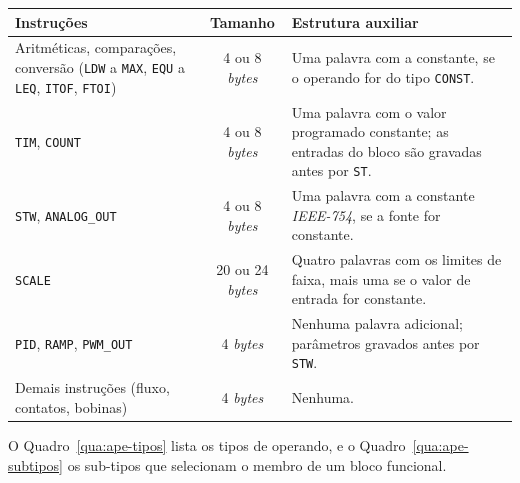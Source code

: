 \begin{quadrofixo}
    \centering
    \begin{tabular}{|p{4.6cm}|c|p{6.4cm}|}
        \hline
        Instruções & Tamanho & Estrutura auxiliar \\
        \hline
        Aritméticas, comparações, conversão (\texttt{LDW} a \texttt{MAX}, \texttt{EQU} a \texttt{LEQ}, \texttt{ITOF}, \texttt{FTOI}) & 4 ou 8 \textit{bytes} & Uma palavra com a constante, se o operando for do tipo \texttt{CONST}. \\
        \hline
        \texttt{TIM}, \texttt{COUNT} & 4 ou 8 \textit{bytes} & Uma palavra com o valor programado constante; as entradas do bloco são gravadas antes por \texttt{ST}. \\
        \hline
        \texttt{STW}, \texttt{ANALOG\_OUT} & 4 ou 8 \textit{bytes} & Uma palavra com a constante \textit{IEEE-754}, se a fonte for constante. \\
        \hline
        \texttt{SCALE} & 20 ou 24 \textit{bytes} & Quatro palavras com os limites de faixa, mais uma se o valor de entrada for constante. \\
        \hline
        \texttt{PID}, \texttt{RAMP}, \texttt{PWM\_OUT} & 4 \textit{bytes} & Nenhuma palavra adicional; parâmetros gravados antes por \texttt{STW}. \\
        \hline
        Demais instruções (fluxo, contatos, bobinas) & 4 \textit{bytes} & Nenhuma. \\
        \hline
    \end{tabular}
    \label{qua:ape-tamanhos}
\end{quadrofixo}

O Quadro~\ref{qua:ape-tipos} lista os tipos de operando, e o Quadro~\ref{qua:ape-subtipos} os sub-tipos que selecionam o membro de um bloco funcional.

